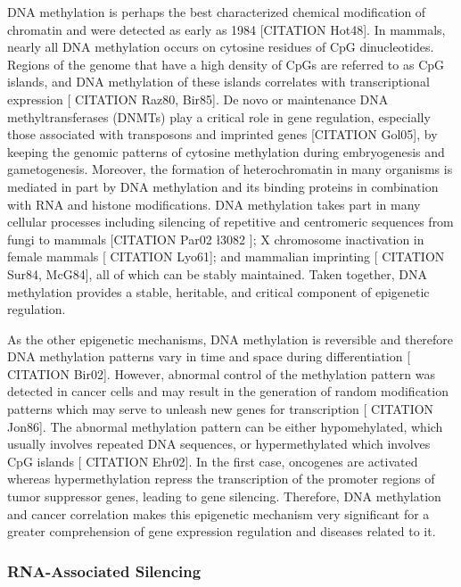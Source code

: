 DNA methylation is perhaps the best characterized chemical modification of chromatin and were detected as early as 1984 [CITATION Hot48]. In mammals, nearly all DNA methylation occurs on cytosine residues of CpG dinucleotides. Regions of the genome that have a high density of CpGs are referred to as CpG islands, and DNA methylation of these islands correlates with transcriptional expression [ CITATION Raz80, Bir85]. De novo or maintenance DNA methyltransferases (DNMTs) play a critical role in gene regulation, especially those associated with transposons and imprinted genes [CITATION Gol05], by keeping the genomic patterns of cytosine methylation during embryogenesis and gametogenesis. Moreover, the formation of heterochromatin in many organisms is mediated in part by DNA methylation and its binding proteins in combination with RNA and histone modifications. DNA methylation takes part in many cellular processes including silencing of repetitive and centromeric sequences from fungi to mammals [CITATION Par02 \l 3082 ]; X chromosome inactivation in female mammals [ CITATION Lyo61]; and mammalian imprinting [ CITATION Sur84, McG84], all of which can be stably maintained. Taken together, DNA methylation provides a stable, heritable, and critical component of epigenetic regulation.

\medskip

As the other epigenetic mechanisms, DNA methylation is reversible and therefore DNA methylation patterns vary in time and space during differentiation [ CITATION Bir02]. However, abnormal control of the methylation pattern was detected in cancer cells and may result in the generation of random modification patterns which may serve to unleash new genes for transcription [ CITATION Jon86]. The abnormal methylation pattern can be either hypomehylated, which usually involves repeated DNA sequences, or hypermethylated which involves CpG islands [ CITATION Ehr02]. In the first case, oncogenes are activated whereas hypermethylation repress the transcription of the promoter regions of tumor suppressor genes, leading to gene silencing. Therefore, DNA methylation and cancer correlation makes this epigenetic mechanism very significant for a greater comprehension of gene expression regulation and diseases related to it.

\subsubsection{RNA-Associated Silencing}

